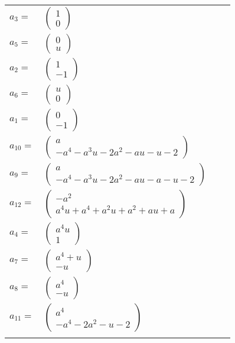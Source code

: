 \documentclass[1p]{elsarticle_modified}
\theoremstyle{definition}
\begin{document}
\begin{tabular}{m{7pt} m{180pt} m{7pt} m{180pt} }
\flushright $a_{3}=$&$\begin{pmatrix}1\\0\end{pmatrix}$ \\
\flushright $a_{5}=$&$\begin{pmatrix}0\\u\end{pmatrix}$ \\
\flushright $a_{2}=$&$\begin{pmatrix}1\\-1\end{pmatrix}$ \\
\flushright $a_{6}=$&$\begin{pmatrix}u\\0\end{pmatrix}$ \\
\flushright $a_{1}=$&$\begin{pmatrix}0\\-1\end{pmatrix}$ \\
\flushright $a_{10}=$&$\begin{pmatrix}a\\- a^4- a^3 u-2 a^2- a u- u-2\end{pmatrix}$ \\
\flushright $a_{9}=$&$\begin{pmatrix}a\\- a^4- a^3 u-2 a^2- a u- a- u-2\end{pmatrix}$ \\
\flushright $a_{12}=$&$\begin{pmatrix}- a^2\\a^4 u+a^4+a^2 u+a^2+a u+a\end{pmatrix}$ \\
\flushright $a_{4}=$&$\begin{pmatrix}a^4 u\\1\end{pmatrix}$ \\
\flushright $a_{7}=$&$\begin{pmatrix}a^4+u\\- u\end{pmatrix}$ \\
\flushright $a_{8}=$&$\begin{pmatrix}a^4\\- u\end{pmatrix}$ \\
\flushright $a_{11}=$&$\begin{pmatrix}a^4\\- a^4-2 a^2- u-2\end{pmatrix}$\\&\end{tabular}
\end{document}
